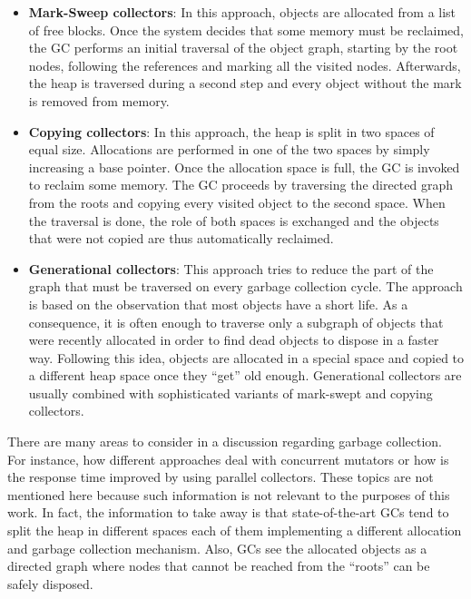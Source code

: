 \begin{itemize}
\item \textbf{Mark-Sweep collectors}: In this approach, objects are allocated from a list of free blocks.
Once the system decides that some memory must be reclaimed, the GC performs an initial traversal of the object graph, starting by the root nodes, following the references and marking all the visited nodes.
Afterwards, the heap is traversed during a second step and every object without the mark is removed from memory.

\item \textbf{Copying collectors}: In this approach, the heap is split in two spaces of equal size.
Allocations are performed in one of the two spaces by simply increasing a base pointer.
Once the allocation space is full, the GC is invoked to reclaim some memory.
The GC proceeds by traversing the directed graph from the roots and copying every visited object to the second space.
When the traversal is done, the role of both spaces is exchanged and the objects that were not copied are thus automatically reclaimed.

\item \textbf{Generational collectors}: This approach tries to reduce the part of the graph that must be traversed on every garbage collection cycle.
The approach is based on the observation that most objects have a short life.
As a consequence, it is often enough to traverse only a subgraph of objects that were recently allocated in order to find dead objects to dispose in a faster way.
Following this idea, objects are allocated in a special space and copied to a different heap space once they ``get'' old enough. 
Generational collectors are usually combined with sophisticated variants of mark-swept and copying collectors.
\end{itemize} 

There are many areas to consider in a discussion regarding garbage collection.
For instance, how different approaches deal with concurrent mutators or how is the response time improved by using parallel collectors.
These topics are not mentioned here because such information is not relevant to the purposes of this work.
In fact, the information to take away is that state-of-the-art GCs tend to split the heap in different spaces each of them implementing a different allocation and garbage collection mechanism.
Also, GCs see the allocated objects as a directed graph where nodes that cannot be reached from the ``roots'' can be safely disposed.

